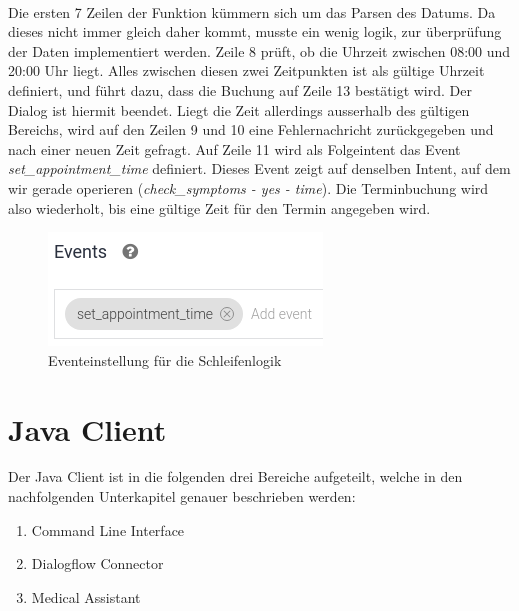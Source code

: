 \documentclass[11pt,a4paper]{article}
\begin{document}
        \paragraph{}
            Die ersten 7 Zeilen der Funktion kümmern sich um das Parsen des Datums. Da dieses nicht immer gleich daher kommt,
            musste ein wenig logik, zur überprüfung der Daten implementiert werden. Zeile 8 prüft, ob die Uhrzeit zwischen 08:00
            und 20:00 Uhr liegt. Alles zwischen diesen zwei Zeitpunkten ist als gültige Uhrzeit definiert, und führt dazu, dass die
            Buchung auf Zeile 13 bestätigt wird. Der Dialog ist hiermit beendet. Liegt die Zeit allerdings ausserhalb des gültigen
            Bereichs, wird auf den Zeilen 9 und 10 eine Fehlernachricht zurückgegeben und nach einer neuen Zeit gefragt.
            Auf Zeile 11 wird als Folgeintent das Event \emph{set\_appointment\_time} definiert. Dieses Event zeigt auf denselben 
            Intent, auf dem wir gerade operieren (\emph{check\_symptoms - yes - time}). Die Terminbuchung wird also wiederholt, bis
            eine gültige Zeit für den Termin angegeben wird. 

        \begin{figure}[h!]
            \begin{center}
                \includegraphics[width=0.5\linewidth]{eventSetting.png}
				\caption{Eventeinstellung für die Schleifenlogik}
            	\label{fig:eventSetting}
            \end{center}
        \end{figure}
 
\newpage

\section{Java Client}
	Der Java Client ist in die folgenden drei Bereiche aufgeteilt, welche in den nachfolgenden Unterkapitel genauer beschrieben werden:
	\begin{enumerate}
		\item Command Line Interface
		\item Dialogflow Connector
		\item Medical Assistant
	\end{enumerate}
\end{document}
